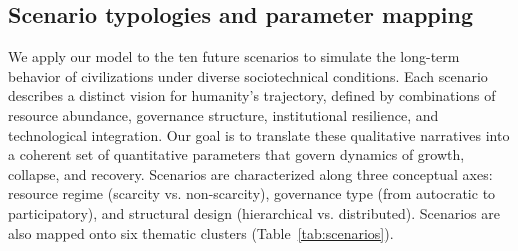 \subsection{Scenario typologies and parameter mapping}\label{scenario-typologies-and-parameter-mapping}

We apply our model to the ten future scenarios to simulate the long-term behavior of civilizations under diverse sociotechnical conditions. Each scenario describes a distinct vision for humanity's trajectory, defined by combinations of resource abundance, governance structure, institutional resilience, and technological integration. Our goal is to translate these qualitative narratives into a coherent set of quantitative parameters that govern dynamics of growth, collapse, and recovery. Scenarios are characterized along three conceptual axes: resource regime (scarcity vs. non-scarcity), governance type (from autocratic to participatory), and structural design (hierarchical vs. distributed). Scenarios are also mapped onto six thematic clusters (Table~\ref{tab:scenarios}).

